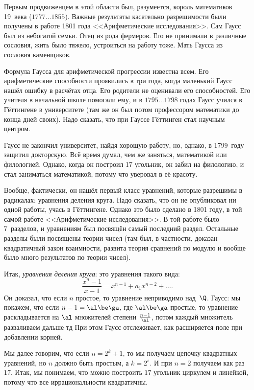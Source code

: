 \documentclass[a4paper,oneside,fleqn,10pt]{article}
\newcommand{\pe}[2]{${#1}\ldots{#2}$}
\begin{document}
Первым продвиженцем в этой области был, разумеется, король математиков
19~века 
(\pe{1777}{1855}).  Важные результаты касательно разрешимости были
получены в работе 1801 года <<Арифметические исследования>>.  Сам
Гаусс был из небогатой семьи. Отец из рода фермеров. Его не принимали
в различные сословия, жить было тяжело, устроиться на работу тоже.
Мать Гаусса из сословия каменщиков.

Формула Гаусса для арифметической прогрессии известна всем. Его
арифметические способности проявились в три года, когда маленький
Гаусс нашёл ошибку в расчётах отца.  Его родители не оценивали его
способностей. Его учителя в начальной школе помогали ему, и в
\pe{1795}{1798} годах Гаусс учился в Гёттингене в университете (там же
он был потом профессором математики до конца дней своих).  Надо
сказать, что при Гауссе Гёттинген стал научным центром.

Гаусс не закончил университет, найдя хорошую работу, но, однако, в
1799~году защитил докторскую.  Всё время думал, чем же заняться,
математикой или филологией. Однако, когда он построил 17 угольник, он
забил на филологию, и стал заниматься математикой, потому что уверовал
в её красоту.

Вообще, фактически, он нашёл первый класс уравнений, которые разрешимы
в радикалах: уравнения деления круга.  Надо сказать, что он не
опубликовал ни одной работы, учась в Гёттингене.  Однако это было
сделано в 1801 году, в той самой работе <<Арифметические
исследования>>.  В той работе было 7~разделов, и уравнениям был
посвящён самый последний раздел.  Остальные разделы были посвящены
теории чисел (там был, в частности, доказан квадратичный закон
взаимности, развита теория сравнений по модулю и вообще было много
результатов по теории чисел).

Итак, \emph{уравнения деления круга}: это уравнения такого вида:
$$\frac{x^n-1}{x-1} = x^{n-1} + a_1 x^{n-2} + \dots.$$ Он доказал, что
если $n$ простое, то уравнение неприводимо над~$\Q$.  Гаусс: мы
покажем, что если $n-1 = \al\be\ga$, где $\al\be\ga$ простые, то
уравнение раскладывается на $\al$ множителей степени
$\frac{n-1}{\al}$, потом каждый множитель разваливаем дальше тд При
этом Гаусс отслеживает, как расширяется поле при добавлении корней.

Мы далее говорим, что если $n=2^k+1$, то мы получаем цепочку
квадратных уравнений, но $n$ должно быть простым, а $k = 2^s$.  И при
$n=2$ получаем как раз $17$. Итак, мы понимаем, что можно построить
$17$ угольник циркулем и линейкой, потому что все иррациональности
квадратичны.
\end{document}
